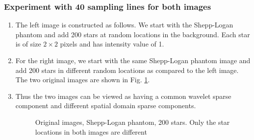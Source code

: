 \subsubsection{Experiment with 40 sampling lines for both images}
\begin{enumerate}
\item The left image is constructed as follows. We start with the Shepp-Logan phantom and add 200 stars at random locations in the background. Each star is of size $2 \times 2$ pixels and has intensity value of 1.
\item For the right image, we start with the same Shepp-Logan phantom image and add 200 stars in different random locations as compared to the left image. The two original images are shown in Fig. \ref{fig:expt51}.
\item Thus the two images can be viewed as having a common wavelet sparse component and different spatial domain sparse components.
\begin{figure}[b!]
\hspace{0.4in}
		\hspace{0.2in}
\caption [Original images, Shepp-Logan phantom, 200 stars]{Original images, Shepp-Logan phantom, 200 stars. Only the star locations in both images are different}
\label{fig:expt51}
\end{figure}


\end{enumerate}
